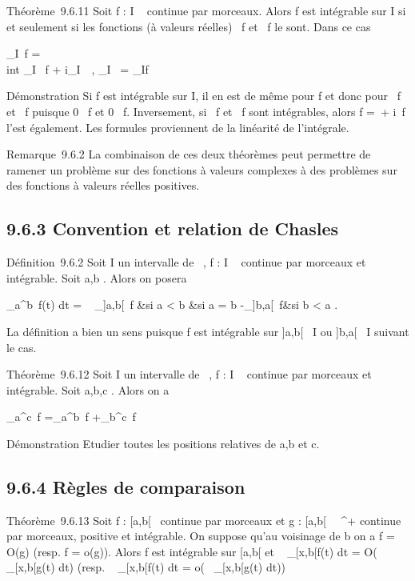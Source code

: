 \documentclass[]{article}
\begin{document}
Théorème~9.6.11 Soit f : I \rightarrow~  continue par morceaux. Alors f est
intégrable sur I si et seulement si les fonctions (à valeurs réelles)
\mathrmRe~f et
\mathrmIm~f le sont. Dans ce
cas

\int  _I~f =\\int
 _I \mathrmRe~f +
i\int  _I~\
\mathrmImf,\quad
\int  _I\overlinef~ =
\overline\int  _If~

Démonstration Si f est intégrable sur I, il en est de même pour
f et donc pour
\mathrmRe~f et
\mathrmIm~f puisque 0
\leq\mathrmRe~f\leqf
et 0
\leq\mathrmIm~f\leqf.
Inversement, si \mathrmRe~f
et \mathrmIm~f sont
intégrables, alors f =\
\mathrmRef +
i\mathrmIm~f l'est
également. Les formules proviennent de la linéarité de l'intégrale.

Remarque~9.6.2 La combinaison de ces deux théorèmes peut permettre de
ramener un problème sur des fonctions à valeurs complexes à des
problèmes sur des fonctions à valeurs réelles positives.

\subsection{9.6.3 Convention et relation de Chasles}

Définition~9.6.2 Soit I un intervalle de ~, f : I \rightarrow~  continue par
morceaux et intégrable. Soit a,b \in\overlineI. Alors
on posera

\int  _a^b~f(t) dt =
\left \ \cases
\int  _]a,b[~f &si a < b
 &si a = b \cr
-\int  _]b,a[~f&si b < a
 \right .

La définition a bien un sens puisque f est intégrable sur ]a,b[\subset~ I
ou ]b,a[\subset~ I suivant le cas.

Théorème~9.6.12 Soit I un intervalle de ~, f : I \rightarrow~  continue par
morceaux et intégrable. Soit a,b,c \in\overlineI. Alors
on a

\int  _a^c~f
=\int  _a^b~f
+\int  _b^c~f

Démonstration Etudier toutes les positions relatives de a,b et c.

\subsection{9.6.4 Règles de comparaison}

Théorème~9.6.13 Soit f : [a,b[\rightarrow~  continue par morceaux et g :
[a,b[\rightarrow~ ~^+ continue par morceaux, positive et intégrable.
On suppose qu'au voisinage de b on a f = O(g) (resp. f = o(g)). Alors f
est intégrable sur [a,b[ et \int ~
_[x,b[f(t) dt = O(\int ~
_[x,b[g(t) dt) (resp. \int ~
_[x,b[f(t) dt = o(\int ~
_[x,b[g(t) dt))
\end{document}
